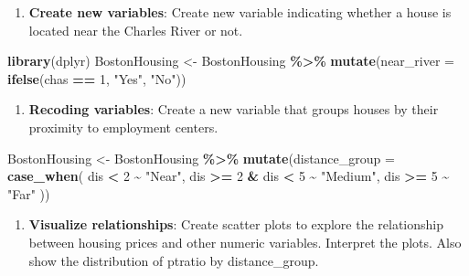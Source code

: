 \documentclass[
]{book}
\newenvironment{Shaded}{\begin{snugshade}}{\end{snugshade}}
\newcommand{\AttributeTok}[1]{\textcolor[rgb]{0.13,0.29,0.53}{#1}}
\newcommand{\DecValTok}[1]{\textcolor[rgb]{0.00,0.00,0.81}{#1}}
\newcommand{\FunctionTok}[1]{\textcolor[rgb]{0.13,0.29,0.53}{\textbf{#1}}}
\newcommand{\NormalTok}[1]{#1}
\newcommand{\OtherTok}[1]{\textcolor[rgb]{0.56,0.35,0.01}{#1}}
\newcommand{\SpecialCharTok}[1]{\textcolor[rgb]{0.81,0.36,0.00}{\textbf{#1}}}
\newcommand{\StringTok}[1]{\textcolor[rgb]{0.31,0.60,0.02}{#1}}
\providecommand{\tightlist}{%
  \setlength{\itemsep}{0pt}\setlength{\parskip}{0pt}}
\begin{document}
\begin{enumerate}
\def\labelenumi{\arabic{enumi}.}
\setcounter{enumi}{4}
\tightlist
\item
  \textbf{Create new variables}: Create new variable indicating whether a house is located near the Charles River or not.
\end{enumerate}

\begin{Shaded}
\begin{Highlighting}[]
\FunctionTok{library}\NormalTok{(dplyr)}
\NormalTok{BostonHousing }\OtherTok{\textless{}{-}}\NormalTok{ BostonHousing }\SpecialCharTok{\%\textgreater{}\%}
  \FunctionTok{mutate}\NormalTok{(}\AttributeTok{near\_river =} \FunctionTok{ifelse}\NormalTok{(chas }\SpecialCharTok{==} \DecValTok{1}\NormalTok{, }\StringTok{"Yes"}\NormalTok{, }\StringTok{"No"}\NormalTok{))}
\end{Highlighting}
\end{Shaded}

\begin{enumerate}
\def\labelenumi{\arabic{enumi}.}
\setcounter{enumi}{5}
\tightlist
\item
  \textbf{Recoding variables}: Create a new variable that groups houses by their proximity to employment centers.
\end{enumerate}

\begin{Shaded}
\begin{Highlighting}[]
\NormalTok{BostonHousing }\OtherTok{\textless{}{-}}\NormalTok{ BostonHousing }\SpecialCharTok{\%\textgreater{}\%}
  \FunctionTok{mutate}\NormalTok{(}\AttributeTok{distance\_group =} \FunctionTok{case\_when}\NormalTok{(}
\NormalTok{    dis }\SpecialCharTok{\textless{}} \DecValTok{2} \SpecialCharTok{\textasciitilde{}} \StringTok{"Near"}\NormalTok{,}
\NormalTok{    dis }\SpecialCharTok{\textgreater{}=} \DecValTok{2} \SpecialCharTok{\&}\NormalTok{ dis }\SpecialCharTok{\textless{}} \DecValTok{5} \SpecialCharTok{\textasciitilde{}} \StringTok{"Medium"}\NormalTok{,}
\NormalTok{    dis }\SpecialCharTok{\textgreater{}=} \DecValTok{5} \SpecialCharTok{\textasciitilde{}} \StringTok{"Far"}
\NormalTok{  ))}
\end{Highlighting}
\end{Shaded}

\begin{enumerate}
\def\labelenumi{\arabic{enumi}.}
\setcounter{enumi}{6}
\tightlist
\item
  \textbf{Visualize relationships}: Create scatter plots to explore the relationship between housing prices and other numeric variables. Interpret the plots. Also show the distribution of ptratio by distance\_group.
\end{enumerate}
\end{document}
